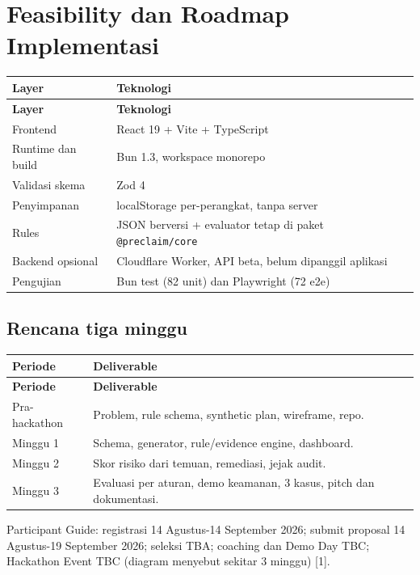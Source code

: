 \documentclass[11pt,a4paper]{article}
\begin{document}
\section{Feasibility dan Roadmap Implementasi}
\begin{longtable}{|p{5cm}|p{10cm}|}
\hline
\rowcolor{blue!15} \textbf{Layer} & \textbf{Teknologi} \\ \hline
\endfirsthead
\hline
\rowcolor{blue!15} \textbf{Layer} & \textbf{Teknologi} \\ \hline
\endhead
Frontend & React 19 + Vite + TypeScript \\ \hline
Runtime dan build & Bun 1.3, workspace monorepo \\ \hline
Validasi skema & Zod 4 \\ \hline
Penyimpanan & localStorage per-perangkat, tanpa server \\ \hline
Rules & JSON berversi + evaluator tetap di paket \texttt{@preclaim/core} \\ \hline
Backend opsional & Cloudflare Worker, API beta, belum dipanggil aplikasi \\ \hline
Pengujian & Bun test (82 unit) dan Playwright (72 e2e) \\ \hline
\end{longtable}
\subsection{Rencana tiga minggu}
\begin{longtable}{|p{4cm}|p{11cm}|}
\hline
\rowcolor{blue!15} \textbf{Periode} & \textbf{Deliverable} \\ \hline
\endfirsthead
\hline
\rowcolor{blue!15} \textbf{Periode} & \textbf{Deliverable} \\ \hline
\endhead
Pra-hackathon & Problem, rule schema, synthetic plan, wireframe, repo. \\ \hline
Minggu 1 & Schema, generator, rule/evidence engine, dashboard. \\ \hline
Minggu 2 & Skor risiko dari temuan, remediasi, jejak audit. \\ \hline
Minggu 3 & Evaluasi per aturan, demo keamanan, 3 kasus, pitch dan dokumentasi. \\ \hline
\end{longtable}
Participant Guide: registrasi 14 Agustus-14 September 2026; submit proposal 14 Agustus-19 September 2026; seleksi TBA; coaching dan Demo Day TBC; Hackathon Event TBC (diagram menyebut sekitar 3 minggu) [1].
\end{document}
